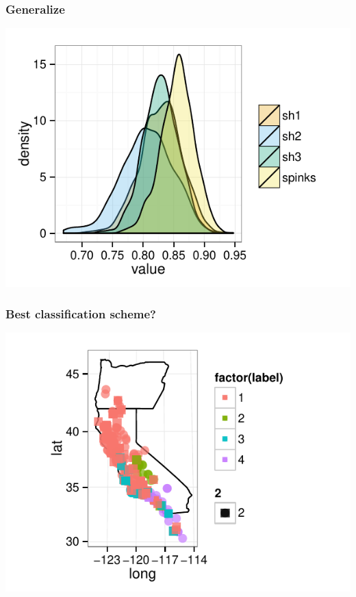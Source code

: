 \documentclass{beamer}\usepackage{graphicx, color}
\makeatletter
\def\maxwidth{ %
  \ifdim\Gin@nat@width>\linewidth
    \linewidth
  \else
    \Gin@nat@width
  \fi
}
\newenvironment{knitrout}{}{} %
\makeatother
\begin{document}

\begin{frame}
  \frametitle{Generalize}
\begin{knitrout}
\color{fgcolor}
\includegraphics[width=\maxwidth]{figure/unnamed-chunk-4} 

\end{knitrout}


\end{frame}

\begin{frame}
  \frametitle{Best classification scheme?}
\begin{knitrout}
\color{fgcolor}
\includegraphics[width=\maxwidth]{figure/unnamed-chunk-5} 

\end{knitrout}


\end{frame}
\end{document}
